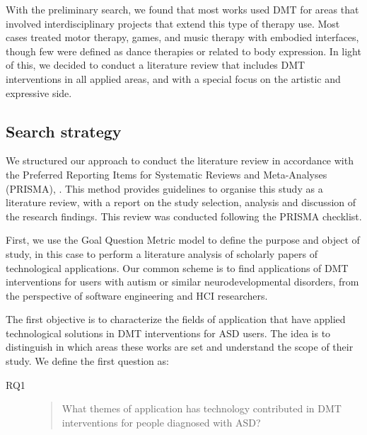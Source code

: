 \documentclass[a4paper,fleqn]{cas-sc}
\begin{document}
With the preliminary search, we found that most works used DMT for areas that involved interdisciplinary projects that extend this type of therapy use. Most cases treated motor therapy, games, and music therapy with embodied interfaces, though few were defined as dance therapies or related to body expression. In light of this, we decided to conduct a literature review that includes DMT interventions in all applied areas, and with a special focus on the artistic and expressive side. 

\subsection{Search strategy}
We structured our approach to conduct the literature review in accordance with the Preferred Reporting Items for Systematic Reviews and Meta-Analyses (PRISMA), \cite{Pagen71}. This method provides guidelines to organise this study as a literature review, with a report on the study selection, analysis and discussion of the research findings. This review was conducted following the PRISMA checklist.

First, we use the Goal Question Metric model \cite{Koziolek} to define the purpose and object of study, in this case to perform a literature analysis of scholarly papers of technological applications. Our common scheme is to find applications of DMT interventions for users with autism or similar neurodevelopmental disorders, from the perspective of software engineering and HCI researchers.



The first objective is to characterize the fields of application that have applied technological solutions in DMT interventions for ASD users.  The idea is to distinguish in which areas these works are set and understand the scope of their study. We define the first question as:

\begin{description}
  \item[RQ1] \begin{quote}What themes of application has technology contributed in DMT interventions for people diagnosed with ASD?\end{quote}
\end{description}
\end{document}
